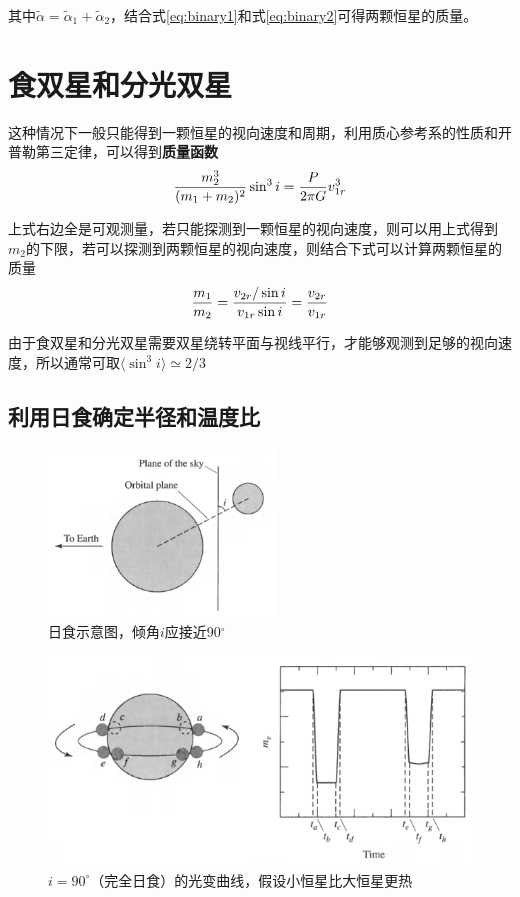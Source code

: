 \documentclass[openany]{ctexbook}
\begin{document}
其中$\widetilde \alpha=\widetilde \alpha_1+\widetilde \alpha_2$，结合式\ref{eq:binary1}和式\ref{eq:binary2}可得两颗恒星的质量。

\section{食双星和分光双星}
这种情况下一般只能得到一颗恒星的视向速度和周期，利用质心参考系的性质和开普勒第三定律，可以得到\textbf{质量函数}
\begin{equation}
  {m^3_2\over (m_1+m_2)^2}\sin^3 i={P\over 2\pi G}v^3_{1r}
\end{equation}

上式右边全是可观测量，若只能探测到一颗恒星的视向速度，则可以用上式得到$m_2$的下限，若可以探测到两颗恒星的视向速度，则结合下式可以计算两颗恒星的质量
\begin{equation}
  {m_1\over m_2}={v_{2r}/ \sin{i}\over v_{1r}\sin{i}}={v_{2r} \over v_{1r}}
\end{equation}

由于食双星和分光双星需要双星绕转平面与视线平行，才能够观测到足够的视向速度，所以通常可取$\langle\sin^3 i\rangle\simeq2/3$

\subsection{利用日食确定半径和温度比}
\begin{figure}[hbt]
  \centering
  \includegraphics[width=6cm]{chapters/07/eclipse1}
  \caption{日食示意图，倾角$i$应接近90$^\circ$}
  \label{}
\end{figure}

\begin{figure}[hbt]
  \centering
  \includegraphics[width=12cm]{chapters/07/eclipse2}
  \caption{$i=90^\circ$（完全日食）的光变曲线，假设小恒星比大恒星更热}
  \label{}
\end{figure}
\end{document}
